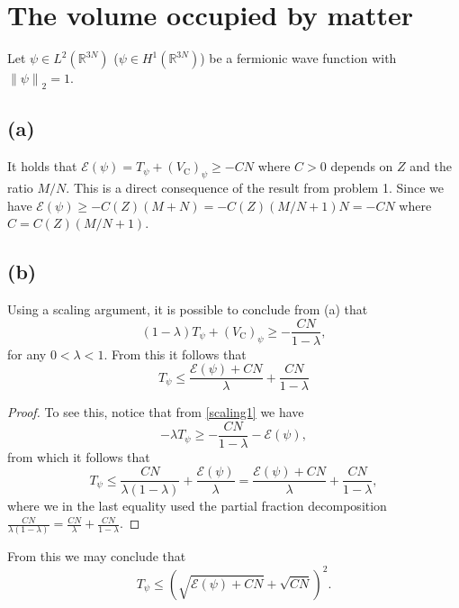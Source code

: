 \documentclass[a4paper,11pt]{article}
\newcommand{\norm}[1]{\left\lVert #1 \right\rVert}
\newcommand{\R}{\mathbb{R}}
\numberwithin{equation}{section}
\begin{document}
 \section{The volume occupied by matter}
 Let $ \psi\in L^2(\R^{3N}) $ ($ \psi\in H^1(\R^{3N}) $) be a fermionic wave function  with $ \norm{\psi}_2=1 $.
 \subsection*{(a)}
 It holds that $ \mathcal{E}(\psi)=T_\psi+(V_\text{C})_\psi\geq-CN $ where $ C>0 $ depends on $ Z $ and the ratio $ M/N $. This is a direct consequence of the result from problem 1. Since we have $ \mathcal{E}(\psi)\geq -C(Z)(M+N)=-C(Z)(M/N+1)N=-CN $ where $ C=C(Z)(M/N+1) $.
 \subsection*{(b)}
 Using a scaling argument, it is possible to conclude from (a) that \begin{equation}
 (1-\lambda)T_\psi+(V_\text{C})_\psi\geq-\frac{CN}{1-\lambda},\label{scaling1}
 \end{equation}
 for any $ 0<\lambda<1 $. From this it follows that \begin{equation}
 T_\psi\leq\frac{\mathcal{E}(\psi)+CN}{\lambda}+\frac{CN}{1-\lambda} \label{ineq1}
 \end{equation}
 \begin{proof}
 	To see this, notice that from \eqref{scaling1} we have \begin{equation}
 	-\lambda T_\psi\geq-\frac{CN}{1-\lambda}-\mathcal{E}(\psi),
 	\end{equation}
 	from which it follows that\begin{equation}
 	T_\psi\leq \frac{CN}{\lambda(1-\lambda)}+\frac{\mathcal{E}(\psi)}{\lambda}=\frac{\mathcal{E}(\psi)+CN}{\lambda}+\frac{CN}{1-\lambda},
 	\end{equation}
 	where we in the last equality used the partial fraction decomposition $ \frac{CN}{\lambda(1-\lambda)}=\frac{CN}{\lambda}+\frac{CN}{1-\lambda} $.
 \end{proof}
 	From this we may conclude that \begin{equation}
 	T_\psi\leq(\sqrt{\mathcal{E}(\psi)+CN}+\sqrt{CN})^2.
 	\end{equation}
\end{document}

